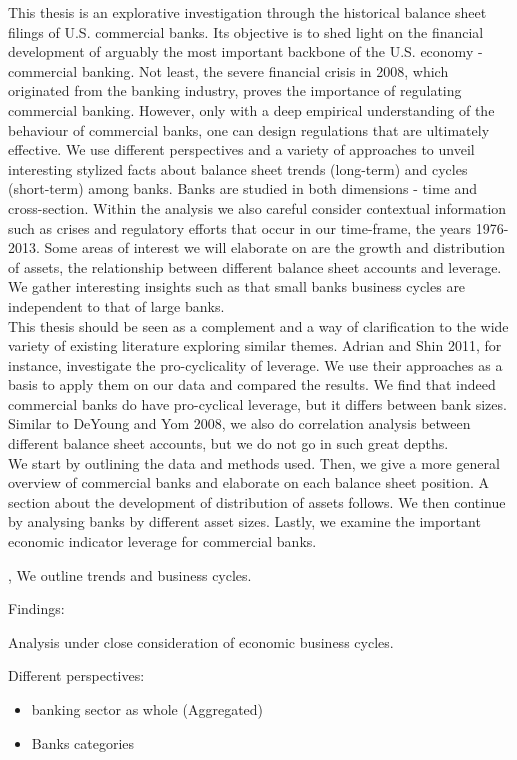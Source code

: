 \documentclass[12pt, a4paper]{article} %
\begin{document}
This thesis is an explorative investigation through the historical balance sheet filings of U.S. commercial banks. Its objective is to shed light on the financial development of arguably the most important backbone of the U.S. economy - commercial banking. Not least, the severe financial crisis in 2008, which originated from the banking industry, proves the importance of regulating commercial banking. However, only with a deep empirical understanding of the behaviour of commercial banks, one can design regulations that are ultimately effective. We use different perspectives and a variety of approaches to unveil interesting stylized facts about balance sheet trends (long-term) and cycles (short-term) among banks. Banks are studied in both dimensions - time and cross-section. Within the analysis we also careful consider contextual information such as crises and regulatory efforts that occur in our time-frame, the years 1976-2013. Some areas of interest we will elaborate on are the growth and distribution of assets, the relationship between different balance sheet accounts and leverage. We gather interesting insights such as that small banks business cycles are independent to that of large banks.\\
This thesis should be seen as a complement and a way of clarification to the wide variety of existing literature exploring similar themes. Adrian and Shin 2011, for instance, investigate the pro-cyclicality of leverage. We use their approaches as a basis to apply them on our data and compared the results. We find that indeed commercial banks do have pro-cyclical leverage, but it differs between bank sizes. Similar to DeYoung and Yom 2008, we also do correlation analysis between different balance sheet accounts, but we do not go in such great depths.\\
We start by outlining the data and methods used. Then, we give a more general overview of commercial banks and elaborate on each balance sheet position. A section about the development of distribution of assets follows. We then continue by analysing banks by different asset sizes. Lastly, we examine the important economic indicator leverage for commercial banks.

\fi

\iffalse
   ,  We outline trends and business cycles. 

Findings:


Analysis under close consideration of economic business cycles.  

Different perspectives: 
\begin{itemize}
\item banking sector as whole (Aggregated)
\item Banks categories
\end{itemize}
\end{document}
